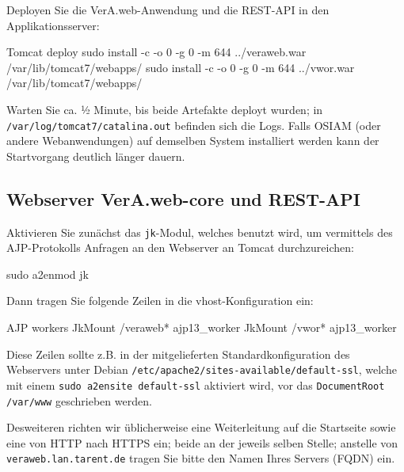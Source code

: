 \begin{minipage}{\textwidth}
Deployen Sie die VerA.web-Anwendung und die REST-API in den Applikationsserver:

\begin{lstdump}{Tomcat deploy}
sudo install -c -o 0 -g 0 -m 644 ../veraweb.war /var/lib/tomcat7/webapps/
sudo install -c -o 0 -g 0 -m 644 ../vwor.war /var/lib/tomcat7/webapps/
\end{lstdump}
\end{minipage}

Warten Sie ca. ½ Minute, bis beide Artefakte deployt wurden; in
\texttt{/var/log/tomcat7/catalina.out} befinden sich die Logs.
\ifoa
Falls OSIAM (oder andere Webanwendungen) auf demselben System
installiert werden kann der Startvorgang deutlich länger dauern.
\fi%

\subsection{Webserver VerA.web-core und REST-API}\label{subsec:setup-core-apache}

\begin{minipage}{\textwidth}
Aktivieren Sie zunächst das \texttt{jk}-Modul, welches benutzt wird,
um vermittels des AJP-Protokolls Anfragen an den Webserver an Tomcat
durchzureichen:

\begin{lstdumpx}
sudo a2enmod jk
\end{lstdumpx}
\end{minipage}

\begin{minipage}{\textwidth}
Dann tragen Sie folgende Zeilen in die vhost-Konfiguration ein:

\begin{lstdump}{AJP workers}
JkMount /veraweb* ajp13_worker
JkMount /vwor* ajp13_worker
\end{lstdump}
\end{minipage}

Diese Zeilen sollte z.B. in der mitgelieferten Standardkonfiguration
des Webservers unter Debian
\texttt{/etc/apache2/sites-available/default-ssl}, welche mit einem
\texttt{sudo a2ensite default-ssl} aktiviert wird, vor das
\texttt{DocumentRoot /var/www} geschrieben werden.

Desweiteren richten wir üblicherweise eine Weiterleitung auf die Startseite
sowie eine von HTTP nach HTTPS ein; beide an der jeweils selben Stelle;
anstelle von \texttt{veraweb.lan.tarent.de} tragen Sie bitte den Namen
Ihres Servers (FQDN) ein.

